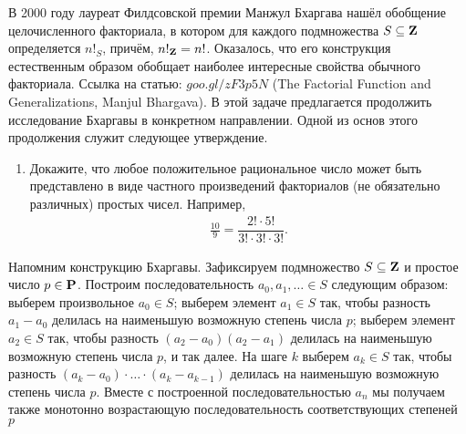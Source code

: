 
В 2000 году лауреат Филдсовской премии Манжул Бхаргава нашёл обобщение целочисленного факториала, в котором для каждого подмножества $S\subseteq \text{\bfseries Z}$ определяется $n!_S$, причём, $n!_\text{\bfseries Z} = n!$. Оказалось, что его конструкция естественным образом обобщает наиболее интересные свойства обычного факториала. Ссылка на статью: \href{https://goo.gl/zF3p5N}{$goo.gl/zF3p5N$} (The Factorial Function and Generalizations, Manjul Bhargava). В этой задаче предлагается продолжить исследование Бхаргавы в конкретном направлении. Одной из основ этого продолжения служит следующее утверждение.

\begin{enumerate}
\item Докажите, что любое положительное рациональное число может быть представлено в виде частного произведений факториалов (не обязательно различных) простых чисел. Например, 
\begin{align*}
\frac{10}{9} = \dfrac{2! \cdot 5!}{3! \cdot 3! \cdot 3!}.
\end{align*}
\end{enumerate}

Напомним конструкцию Бхаргавы. Зафиксируем подмножество $S \subseteq \text{\bfseries Z}$ и простое число $p \in \text{\bfseries P}$. Построим последовательность $a_0, a_1, \ldots \in S$ следующим образом: выберем произвольное $a_0 \in S$; выберем элемент $a_1 \in S$ так, чтобы разность $a_1 - a_0$ делилась на наименьшую возможную степень числа $p$; выберем элемент $a_2 \in S$ так, чтобы разность $(a_2 - a_0)(a_2 - a_1)$ делилась на наименьшую возможную степень числа $p$, и так далее. На шаге $k$ выберем $a_k \in S$ так, чтобы разность $(a_k - a_0)\cdot \ldots \cdot (a_k - a_{k-1})$ делилась на наименьшую возможную степень числа $p$. Вместе с построенной последовательностью $a_n$ мы получаем также монотонно возрастающую последовательность соответствующих степеней $p$

